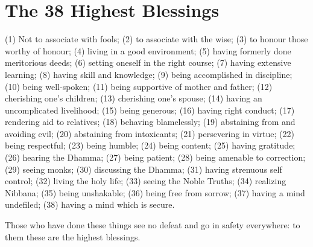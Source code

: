 \clearpage

\section*{The 38 Highest Blessings}

(1) Not to associate with fools;
(2) to associate with the wise;
(3) to honour those worthy of honour;
(4) living in a good environment;
(5) having formerly done meritorious deeds;
(6) setting oneself in the right course;
(7) having extensive learning;
(8) having skill and knowledge;
(9) being accomplished in discipline;
(10) being well-spoken;
(11) being supportive of mother and father;
(12) cherishing one's children;
(13) cherishing one's spouse;
(14) having an uncomplicated livelihood;
(15) being generous;
(16) having right conduct;
(17) rendering aid to relatives;
(18) behaving blamelessly;
(19) abstaining from and avoiding evil;
(20) abstaining from intoxicants;
(21) persevering in virtue;
(22) being respectful;
(23) being humble;
(24) being content;
(25) having gratitude;
(26) hearing the Dhamma;
(27) being patient;
(28) being amenable to correction;
(29) seeing monks;
(30) discussing the Dhamma;
(31) having strenuous self control;
(32) living the holy life;
(33) seeing the Noble Truths;
(34) realizing Nibbana;
(35) being unshakable;
(36) being free from sorrow;
(37) having a mind undefiled;
(38) having a mind which is secure.

Those who have done these things see no defeat and go in safety everywhere: to
them these are the highest blessings.


